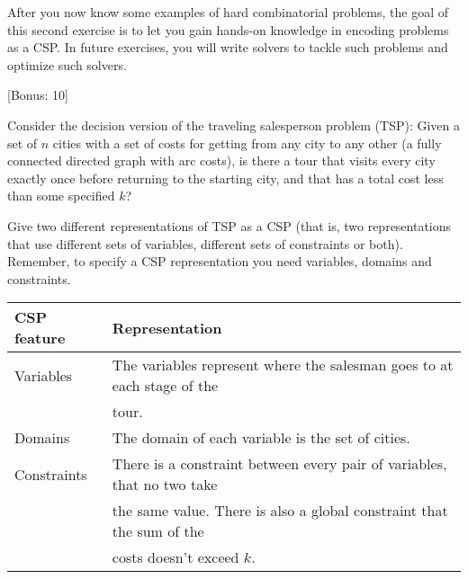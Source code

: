 \documentclass{exam}
\newcommand{\hide}[1]{}
\renewcommand{\hide}[1]{#1}
\begin{document}

After you now know some examples of hard combinatorial problems, the goal of this second exercise is to let you gain hands-on knowledge in encoding problems as a CSP. In future exercises, you will write solvers to tackle such problems and optimize such solvers.

\begin{questions}

[Bonus: 10]

Consider the decision version of the traveling salesperson problem (TSP): Given a set of $n$ cities with a set of costs for getting from any city to any other (a fully connected directed graph with arc costs), is there a tour that visits every city exactly once before returning to the starting city, and that has a total cost less than some specified $k$?

Give two different representations of TSP as a CSP (that is, two representations that use different sets of variables, different sets of constraints or both).  Remember, to specify a CSP representation you need variables, domains and constraints.

\hide{

\begin{tabular}{|l|l|}
\hline
CSP feature &Representation\\
\hline\hline
Variables   &The variables represent where the salesman goes to at each stage of the\\
        &tour.\\
\hline
Domains &The domain of each variable is the set of cities.\\
\hline
Constraints &There is a constraint between every pair of variables, that no two take\\
        &the same value.  There is also a global constraint that the sum of the\\
        &costs doesn't exceed $k$.\\
\hline
\end{tabular}

}
\end{questions}
\end{document}
